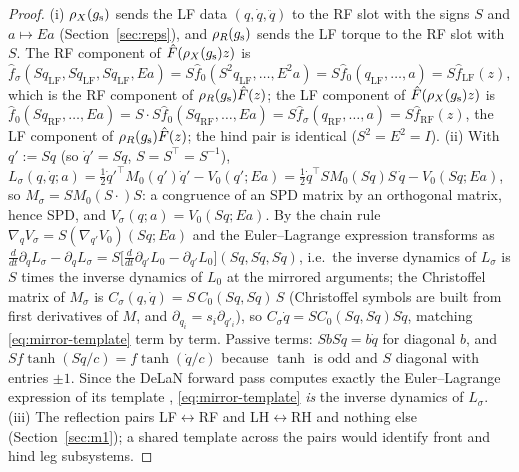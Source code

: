 \begin{proof}
(i) $\rho_{X}(g_{\mathrm{s}})$ sends the LF data $(q,\dot q,\ddot q)$ to the RF slot with
the signs $S$ and $a \mapsto Ea$ (Section~\ref{sec:reps}), and $\rho_{R}(g_{\mathrm{s}})$
sends the LF torque to the RF slot with $S$. The RF component of
$\hat F(\rho_{X}(g_{\mathrm{s}})z)$ is $\hat f_\sigma(Sq_{\mathrm{LF}}, S\dot q_{\mathrm{LF}},
S\ddot q_{\mathrm{LF}}, Ea) = S\hat f_0(S^2 q_{\mathrm{LF}}, \dots, E^2 a) =
S\hat f_0(q_{\mathrm{LF}},\dots,a) = S\hat f_{\mathrm{LF}}(z)$, which is the RF
component of $\rho_{R}(g_{\mathrm{s}})\hat F(z)$; the LF component of $\hat F(\rho_{X}(g_{\mathrm{s}})z)$
is $\hat f_0(Sq_{\mathrm{RF}}, \dots, Ea) = S\cdot S\hat f_0(Sq_{\mathrm{RF}},\dots,Ea)
= S\hat f_\sigma(q_{\mathrm{RF}},\dots,a) = S \hat f_{\mathrm{RF}}(z)$, the LF
component of $\rho_{R}(g_{\mathrm{s}})\hat F(z)$; the hind pair is identical
($S^2 = E^2 = I$). (ii) With $q' := Sq$ (so $\dot q' = S\dot q$, $S = S^\top =
S^{-1}$), $L_\sigma(q,\dot q;a) = \tfrac12 \dot q'^\top M_0(q')\dot q' -
V_0(q';Ea) = \tfrac12\dot q^\top S M_0(Sq) S\,\dot q - V_0(Sq;Ea)$, so
$M_\sigma = S M_0(S\cdot) S$: a congruence of an SPD matrix by an
orthogonal matrix, hence SPD, and $V_\sigma(q;a) = V_0(Sq;Ea)$. By the chain
rule $\nabla_q V_\sigma = S(\nabla_{q'}V_0)(Sq;Ea)$ and the Euler--Lagrange
expression transforms as $\frac{d}{dt}\partial_{\dot q}L_\sigma -
\partial_q L_\sigma = S\bigl[\frac{d}{dt}\partial_{\dot q'}L_0 -
\partial_{q'}L_0\bigr](Sq,S\dot q,S\ddot q)$, i.e.\ the inverse dynamics of
$L_\sigma$ is $S$ times the inverse dynamics of $L_0$ at the mirrored
arguments; the Christoffel matrix of $M_\sigma$ is $C_\sigma(q,\dot q) =
S\,C_0(Sq,S\dot q)\,S$ (Christoffel symbols are built from first
derivatives of $M$, and $\partial_{q_i} = s_i\partial_{q'_i}$), so
$C_\sigma\dot q = S C_0(Sq,S\dot q)S\dot q$, matching \eqref{eq:mirror-template}
term by term. Passive terms: $S b S\dot q = b\dot q$ for diagonal $b$, and
$S f\tanh(S\dot q/c) = f\tanh(\dot q/c)$ because $\tanh$ is odd and $S$
diagonal with entries $\pm 1$. Since the DeLaN forward pass computes exactly
the Euler--Lagrange expression of its template
\cite{lutter2019delan}, \eqref{eq:mirror-template} \emph{is} the inverse
dynamics of $L_\sigma$. (iii) The reflection pairs LF$\leftrightarrow$RF and
LH$\leftrightarrow$RH and nothing else (Section~\ref{sec:m1}); a shared
template across the pairs would identify front and hind leg subsystems.
\end{proof}

